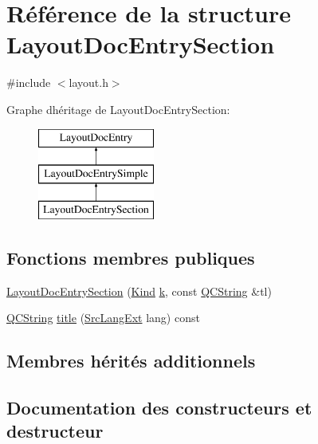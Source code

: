 \hypertarget{struct_layout_doc_entry_section}{}\section{Référence de la structure Layout\+Doc\+Entry\+Section}
\label{struct_layout_doc_entry_section}


{\ttfamily \#include $<$layout.\+h$>$}

Graphe d\textquotesingle{}héritage de Layout\+Doc\+Entry\+Section\+:\begin{figure}[H]
\begin{center}
\leavevmode
\includegraphics[height=3.000000cm]{struct_layout_doc_entry_section}
\end{center}
\end{figure}
\subsection*{Fonctions membres publiques}
\begin{DoxyCompactItemize}
\item 
\hyperlink{struct_layout_doc_entry_section_a9b9b6e896d6ed807088a6800cfa6dafe}{Layout\+Doc\+Entry\+Section} (\hyperlink{struct_layout_doc_entry_a89dcbe762ed7e7f7790d8c034cf8ea01}{Kind} \hyperlink{060__command__switch_8tcl_a20363f854eb4098a446733d63d34dbc1}{k}, const \hyperlink{class_q_c_string}{Q\+C\+String} \&tl)
\item 
\hyperlink{class_q_c_string}{Q\+C\+String} \hyperlink{struct_layout_doc_entry_section_ad2c470e36a9a01c550d7701f743d3027}{title} (\hyperlink{types_8h_a9974623ce72fc23df5d64426b9178bf2}{Src\+Lang\+Ext} lang) const 
\end{DoxyCompactItemize}
\subsection*{Membres hérités additionnels}


\subsection{Documentation des constructeurs et destructeur}
\hypertarget{struct_layout_doc_entry_section_a9b9b6e896d6ed807088a6800cfa6dafe}{}
